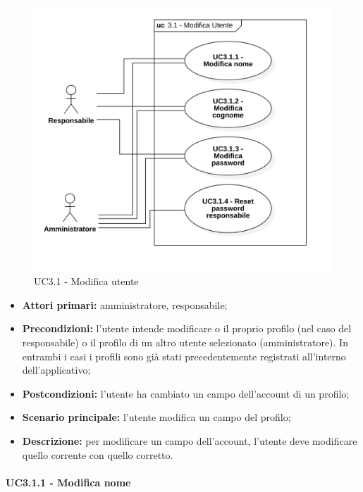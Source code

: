 \begin{figure}[H]
	\centering
	\includegraphics[scale=0.52]{res/images/uc3-1.png}
	\caption{UC3.1 - Modifica utente}
\end{figure}
\begin{itemize}
	\item 	\textbf{Attori primari:} amministratore, responsabile;
	\item 	\textbf{Precondizioni:} l'utente intende modificare o il proprio profilo (nel caso del responsabile) o il profilo di un altro utente selezionato (amministratore). In entrambi i casi i profili sono già stati precedentemente registrati all'interno dell'applicativo;
	\item 	\textbf{Postcondizioni:} l'utente ha cambiato un campo dell'account di un profilo;
	\item 	\textbf{Scenario principale:} l'utente modifica un campo del profilo;
	\item 	\textbf{Descrizione:} per modificare un campo dell'account, l'utente deve modificare quello corrente con quello corretto.

\end{itemize}

\paragraph{UC3.1.1 - Modifica nome}

